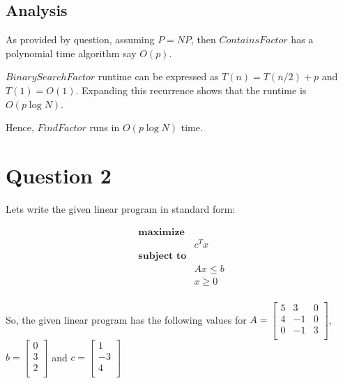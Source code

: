 \documentclass{article}
\begin{document}
    \subsection*{Analysis}
    As provided by question, assuming $P = NP$, then $ContainsFactor$ has a polynomial time algorithm say $O(p)$.

    $BinarySearchFactor$ runtime can be expressed as $T(n) = T(n/2) + p$ and $T(1) = O(1)$. Expanding this recurrence shows that the runtime is $O(p \log N)$.
    
    Hence, $FindFactor$ runs in $O(p \log N)$ time.

    \section*{Question 2}

    Lets write the given linear program in standard form:

    \begin{equation*}
        \begin{aligned}
            \textbf{maximize} \\
            & c^T x \\
            \textbf{subject to} \\
            & Ax \le b \\
            & x \ge 0 \\
        \end{aligned}
    \end{equation*}

    So, the given linear program has the following values for $A = 
    \begin{bmatrix}
        5 & 3 & 0 \\
        4 & -1 & 0 \\
        0 & -1 & 3 \\
    \end{bmatrix}$, $b = 
    \begin{bmatrix}
        0 \\
        3 \\
        2 \\
    \end{bmatrix}$ and $c =
    \begin{bmatrix}
        1 \\
        -3 \\
        4 \\
    \end{bmatrix}$ \\ \\
\end{document}
